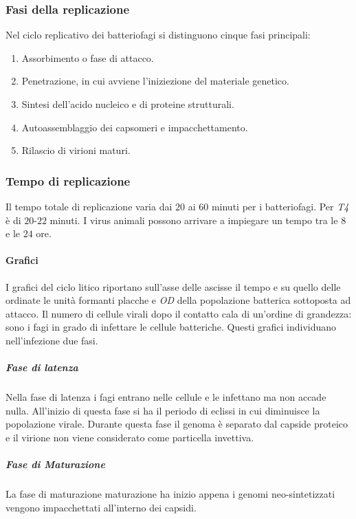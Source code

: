 		\subsubsection{Fasi della replicazione}
		Nel ciclo replicativo dei batteriofagi si distinguono cinque fasi principali:
		\begin{multicols}{2}
			\begin{enumerate}
    				\item Assorbimento o fase di attacco.
    				\item Penetrazione, in cui avviene l'iniziezione del materiale genetico.
    				\item Sintesi dell'acido nucleico e di proteine strutturali.
    				\item Autoassemblaggio dei capsomeri e impacchettamento.
    				\item Rilascio di virioni maturi. 
			\end{enumerate}
		\end{multicols}

		\subsubsection{Tempo di replicazione}
		Il tempo totale di replicazione varia dai $20$ ai $60$ minuti per i batteriofagi.
		Per \emph{T4} \`e di $20$-$22$ minuti.
		I virus animali possono arrivare a impiegare un tempo tra le $8$ e le $24$ ore.

			\paragraph{Grafici}
			I grafici del ciclo litico riportano sull'asse delle ascisse il tempo e su quello delle ordinate le unit\`a formanti placche e \emph{OD} della popolazione batterica sottoposta ad attacco.
			Il numero di cellule virali dopo il contatto cala di un'ordine di grandezza: sono i fagi in grado di infettare le cellule batteriche.
			Questi grafici individuano nell'infezione due fasi.

				\subparagraph{Fase di latenza}
				Nella fase di latenza i fagi entrano nelle cellule e le infettano ma non accade nulla.
				All'inizio di questa fase si ha il periodo di eclissi in cui diminuisce la popolazione virale.
				Durante questa fase il genoma \`e separato dal capside proteico e il virione non viene considerato come particella invettiva.

				\subparagraph{Fase di Maturazione}
				La fase di maturazione maturazione ha inizio appena i genomi neo-sintetizzati vengono impacchettati all'interno dei capsidi.

